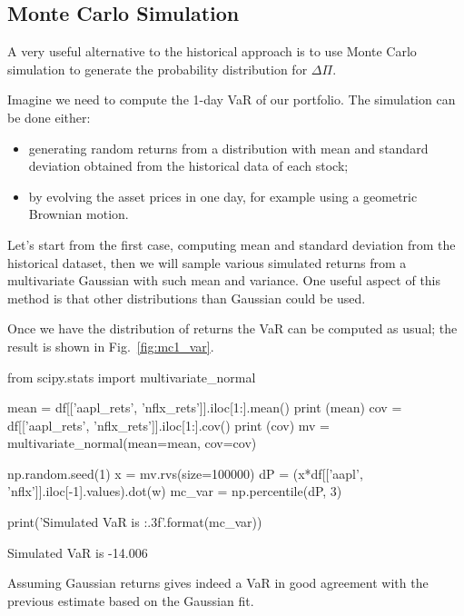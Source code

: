 \subsection{Monte Carlo Simulation}
\label{monte-carlo-simulation}

A very useful alternative to the historical approach is to use Monte Carlo simulation to generate the probability distribution for $\Delta\Pi$. 

Imagine we need to compute the 1-day VaR of our portfolio. The simulation can be done either:
\begin{itemize}
\tightlist
\item generating random returns from a distribution with mean and standard deviation obtained from the historical data of each stock;
\item by evolving the asset prices in one day, for example using a geometric Brownian motion.
\end{itemize}
Let's start from the first case, computing mean and standard deviation from the historical dataset, then we will sample various simulated returns from a multivariate Gaussian with such mean and variance. One useful aspect of this method is that other distributions than Gaussian could be used. 

Once we have the distribution of returns the VaR can be computed as usual; the result is shown in Fig.~\ref{fig:mc1_var}.

\begin{ipython}
from scipy.stats import multivariate_normal

mean = df[['aapl_rets', 'nflx_rets']].iloc[1:].mean()
print (mean)
cov = df[['aapl_rets', 'nflx_rets']].iloc[1:].cov()
print (cov)
mv = multivariate_normal(mean=mean, cov=cov)

np.random.seed(1)
x = mv.rvs(size=100000)
dP = (x*df[['aapl', 'nflx']].iloc[-1].values).dot(w)
mc_var = np.percentile(dP, 3)

print('Simulated VaR is {:.3f}'.format(mc_var))
\end{ipython}
\begin{ioutput}
Simulated VaR is -14.006
\end{ioutput}

Assuming Gaussian returns gives indeed a VaR in good agreement with the previous estimate based on the Gaussian fit.

